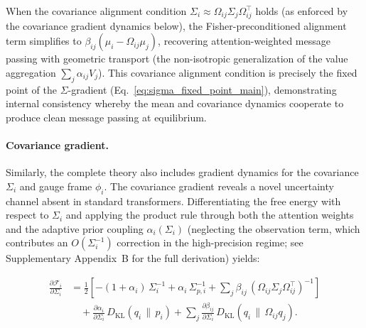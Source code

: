 \documentclass[twoside,11pt]{article}
\begin{document}
When the covariance alignment condition $\Sigma_i \approx \Omega_{ij}\Sigma_j\Omega_{ij}^\top$ holds (as enforced by the covariance gradient dynamics below), the Fisher-preconditioned alignment term simplifies to $\beta_{ij}(\mu_i - \Omega_{ij}\mu_j)$, recovering attention-weighted message passing with geometric transport (the non-isotropic generalization of the value aggregation $\sum_j \alpha_{ij} V_j$). This covariance alignment condition is precisely the fixed point of the $\Sigma$-gradient (Eq.~\ref{eq:sigma_fixed_point_main}), demonstrating internal consistency whereby the mean and covariance dynamics cooperate to produce clean message passing at equilibrium.

\paragraph{Covariance gradient.}

Similarly, the complete theory also includes gradient dynamics for the covariance $\Sigma_i$ and gauge frame $\phi_i$. The covariance gradient reveals a novel uncertainty channel absent in standard transformers.  Differentiating the free energy with respect to $\Sigma_i$ and applying the product rule through both the attention weights and the adaptive prior coupling $\alpha_i(\Sigma_i)$ (neglecting the observation term, which contributes an $O(\Sigma_i^{-1})$ correction in the high-precision regime; see Supplementary Appendix~B for the full derivation) yields:

\begin{equation}
\boxed{
\begin{aligned}
\frac{\partial \mathcal{F}_i}{\partial \Sigma_i}
&= \frac{1}{2}
\left[
-(1+\alpha_i)\, \Sigma_i^{-1}
+ \alpha_i\,\Sigma_{p,i}^{-1}
+ \sum_j \beta_{ij}\,
(\Omega_{ij}\Sigma_j\Omega_{ij}^\top)^{-1}
\right] \\
&\quad + \frac{\partial \alpha_i}{\partial \Sigma_i}\,
      D_{\mathrm{KL}}(q_i \,\|\, p_i)
+ \sum_j \frac{\partial \beta_{ij}}{\partial \Sigma_i}\,
D_{\mathrm{KL}}(q_i \,\|\, \Omega_{ij} q_j).
\end{aligned}
}
\label{eq:Sigma_gradient_main}
\end{equation}
\end{document}
